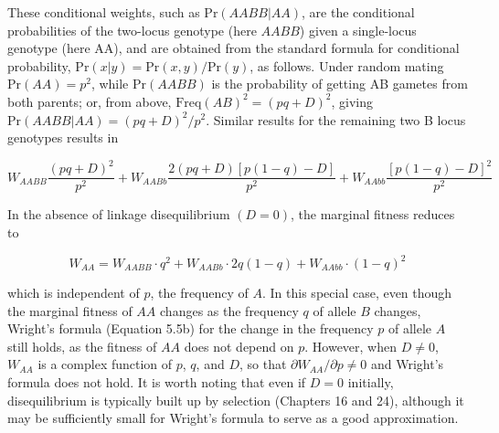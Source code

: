 \documentclass{article}
\begin{document}
These conditional weights, such as  $ \text{Pr}(AABB|AA) $, are the conditional probabilities of the two-locus genotype (here  $ AABB $) given a single-locus genotype (here AA), and are obtained from the standard formula for conditional probability,  $ \text{Pr}(x|y) = \text{Pr}(x,y)/\text{Pr}(y) $, as follows. Under random mating  $ \text{Pr}(AA) = p^2 $, while  $ \text{Pr}(AABB) $ is the probability of getting AB gametes from both parents; or, from above,  $ \text{Freq}(AB)^2 = (pq + D)^2 $, giving  $ \text{Pr}(AABB|AA) = (pq + D)^2/p^2 $. Similar results for the remaining two B locus genotypes results in

\begin{equation}
W_{AABB}\frac{(pq+D)^{2}}{p^{2}}+W_{AABb}\frac{2(pq+D)\left[p\left(1-q\right)-D\right]}{p^{2}}+W_{AAbb}\frac{\left[p(1-q)-D\right]^{2}}{p^{2}}
\end{equation}

In the absence of linkage disequilibrium  $ (D=0) $, the marginal fitness reduces to

\begin{equation}
W_{A A}=W_{A A B B}\cdot q^{2}+W_{A A B b}\cdot2q\left(1-q\right)+W_{A A b b}\cdot\left(1-q\right)^{2}
\end{equation}

which is independent of $p$, the frequency of $A$. In this special case, even though the marginal fitness of $AA$ changes as the frequency $q$ of allele $B$ changes, Wright's formula (Equation 5.5b) for the change in the frequency $p$ of allele $A$ still holds, as the fitness of $AA$ does not depend on $p$. However, when $D \neq 0$, $W_{AA}$ is a complex function of $p$, $q$, and $D$, so that $\partial W_{AA}/\partial p \neq 0$ and Wright's formula does not hold. It is worth noting that even if $D = 0$ initially, disequilibrium is typically built up by selection (Chapters 16 and 24), although it may be sufficiently small for Wright's formula to serve as a good approximation.
\end{document}
